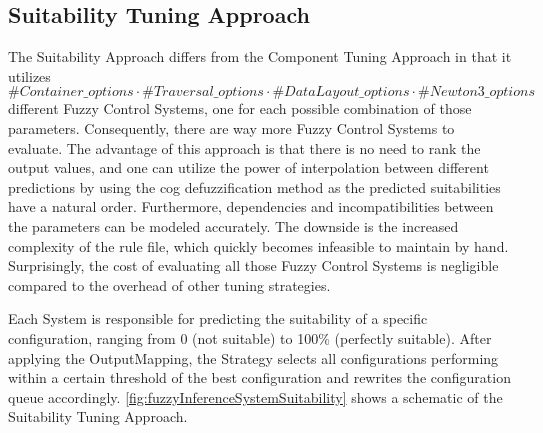 \subsection{Suitability Tuning Approach}

The Suitability Approach differs from the Component Tuning Approach in that it utilizes $\#Container\_options \cdot \#Traversal\_options \cdot \#DataLayout\_options \cdot \#Newton3\_options$ different Fuzzy Control Systems, one for each possible combination of those parameters. Consequently, there are way more Fuzzy Control Systems to evaluate. The advantage of this approach is that there is no need to rank the output values, and one can utilize the power of interpolation between different predictions by using the \gls{cog} defuzzification method as the predicted suitabilities have a natural order. Furthermore, dependencies and incompatibilities between the parameters can be modeled accurately. The downside is the increased complexity of the rule file, which quickly becomes infeasible to maintain by hand. Surprisingly, the cost of evaluating all those Fuzzy Control Systems is negligible compared to the overhead of other tuning strategies.

Each System is responsible for predicting the suitability of a specific configuration, ranging from 0 (not suitable) to 100\% (perfectly suitable). After applying the OutputMapping, the Strategy selects all configurations performing within a certain threshold of the best configuration and rewrites the configuration queue accordingly. \autoref{fig:fuzzyInferenceSystemSuitability} shows a schematic of the Suitability Tuning Approach.

